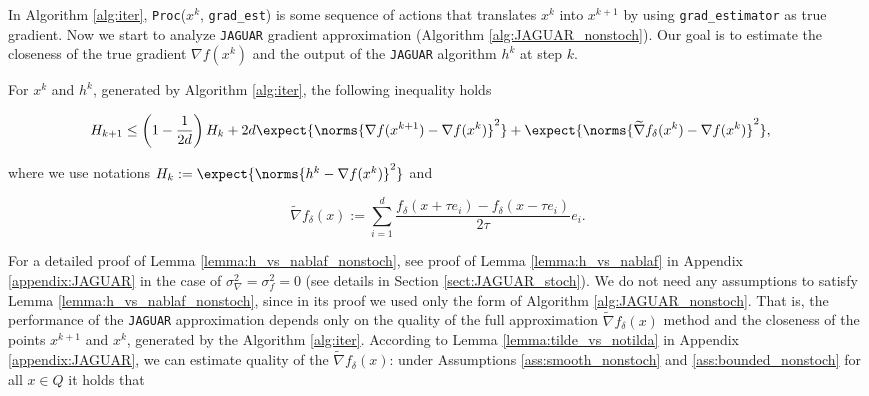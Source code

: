         In Algorithm \ref{alg:iter}, \texttt{Proc}($x^k$, \texttt{grad\_est}) is some sequence of actions that translates $x^k$ into $x^{k+1}$ by using \texttt{grad\_estimator} as true gradient. Now we start to analyze \texttt{JAGUAR} gradient approximation (Algorithm \ref{alg:JAGUAR_nonstoch}). Our goal is to estimate the closeness of the true gradient $\nabla f(x^k)$ and the output of the \texttt{JAGUAR} algorithm $h^k$ at step $k$.

        \begin{lemma}
        \label{lemma:h_vs_nablaf_nonstoch}
            For $x^k$ and $h^k$, generated by Algorithm \ref{alg:iter}, the following inequality holds

            \begin{equation}
            \label{eq:h_vs_nabla_nonstoch}
            \begin{split}
            H_{k+1}
                    &\leq
                    \left(1 - \frac{1}{2 d}\right) H_k
                    + 2d \expect{\norms{\nabla f(x^{k+1}) - \nabla f(x^{k})}^2}
                 +\expect{\norms{\widetilde{\nabla}f_{\delta}(x^k) - \nabla f(x^k)}^2},
            \end{split}
            \end{equation}

            where we use notations $H_k := \expect{\norms{h^k - \nabla f(x^k)}^2}$ and 

            \begin{equation}
            \label{eq:opf_d_nonstoch}
                \widetilde{\nabla}f_{\delta}(x) := \sum\limits_{i=1}^d \dfrac{f_{\delta}(x + \tau e_i) - f_{\delta}(x - \tau e_i)}{2 \tau} e_i. 
            \end{equation}
        \end{lemma}

        For a detailed proof of Lemma \ref{lemma:h_vs_nablaf_nonstoch}, see proof of Lemma \ref{lemma:h_vs_nablaf} in Appendix \ref{appendix:JAGUAR} in the case of $\sigma_\nabla^2 = \sigma_f^2 = 0$ (see details in Section \ref{sect:JAGUAR_stoch}). We do not need any assumptions to satisfy Lemma \ref{lemma:h_vs_nablaf_nonstoch}, since in its proof we used only the form of Algorithm \ref{alg:JAGUAR_nonstoch}. That is, the performance of the \texttt{JAGUAR} approximation depends only on the quality of the full approximation $\widetilde{\nabla}f_{\delta}(x)$ method and the closeness of the points $x^{k+1}$ and $x^k$, generated by the Algorithm \ref{alg:iter}. According to Lemma \ref{lemma:tilde_vs_notilda} in Appendix \ref{appendix:JAGUAR}, we can estimate quality of the $\widetilde{\nabla}f_{\delta}(x)$: under Assumptions \ref{ass:smooth_nonstoch} and \ref{ass:bounded_nonstoch} for all $x \in Q$ it holds that

